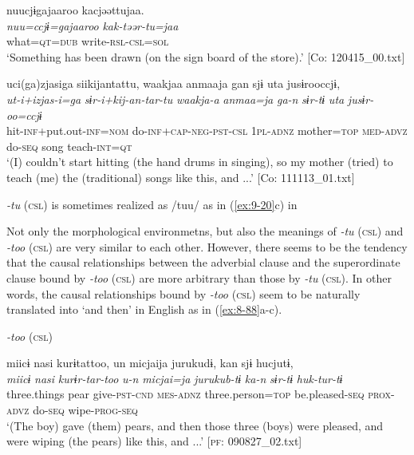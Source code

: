 \ex [= (\ref{ex:5-39}b)]

{\TM}
\glll  nuucjɨgajaaroo  kacjəəttujaa.\\
\textit{nuu=ccjɨ=gajaaroo}  \textit{kak-təər-tu=jaa}\\
what=\textsc{qt}=\textsc{dub}  write-\textsc{rsl}-\textsc{csl}=\textsc{sol}\\
\glt ‘Something has been drawn (on the sign board of the store).’ [Co: 120415\_00.txt]

\ex
{\TM}
\glll  uci(ga)zjasiga  siikijantattu,  waakjaa      anmaaja  gan  sjɨ  uta  jusɨrooccjɨ,
\\
\textit{ut-i+izjas-i=ga}  \textit{sɨr-i+kij-an-tar-tu}  \textit{waakja-a}      \textit{anmaa=ja}  \textit{ga-n}  \textit{sɨr-tɨ}  \textit{uta}  \textit{jusɨr-oo=ccjɨ}\\
hit-\textsc{inf}+put.out-\textsc{inf}=\textsc{nom}  do-\textsc{inf}+\textsc{cap}-\textsc{neg}-\textsc{pst}-\textsc{csl}  1\textsc{pl}-\textsc{adnz}   mother=\textsc{top}  \textsc{med}-\textsc{advz}  do-\textsc{seq}  song  teach-\textsc{int}=\textsc{qt}\\
\glt ‘(I) couldn’t start hitting (the hand drums in singing), so my mother (tried) to teach (me) the (traditional) songs like this, and ...’ [Co: 111113\_01.txt]
\z
\z

\textit{-tu} (\textsc{csl}) is sometimes realized as /tuu/ as in (\ref{ex:9-20}c) in 

Not only the morphological environmetns, but also the meanings of \textit{-tu} (\textsc{csl}) and \textit{-too} (\textsc{csl}) are very similar to each other. However, there seems to be the tendency that the causal relationships between the adverbial clause and the superordinate clause bound by \textit{-too} (\textsc{csl}) are more arbitrary than those by \textit{-tu} (\textsc{csl}). In other words, the causal relationships bound by \textit{-too} (\textsc{csl}) seem to be naturally translated into ‘and then’ in English as in (\ref{ex:8-88}a-c).

\ea\label{ex:8-88}
  \textit{-too} (\textsc{csl})

\ea
{\TM}
\glll  miicɨ  nasi  kurɨtattoo,  un  micjaija      jurukudɨ,  kan  sjɨ  hucjutɨ,\\
\textit{miicɨ}  \textit{nasi}  \textit{kurɨr-tar-too}  \textit{u-n}  \textit{micjai=ja}   \textit{jurukub-tɨ}  \textit{ka-n}  \textit{sɨr-tɨ}  \textit{huk-tur-tɨ}\\
three.things  pear  give-\textsc{pst}-\textsc{cnd}  \textsc{mes}-\textsc{adnz}  three.person=\textsc{top}   be.pleased-\textsc{seq}  \textsc{prox}-\textsc{advz}  do-\textsc{seq}  wipe-\textsc{prog}-\textsc{seq}\\
\glt ‘(The boy) gave (them) pears, and then those three (boys) were pleased, and were wiping (the pears) like this, and ...’ [\textsc{pf}: 090827\_02.txt]

